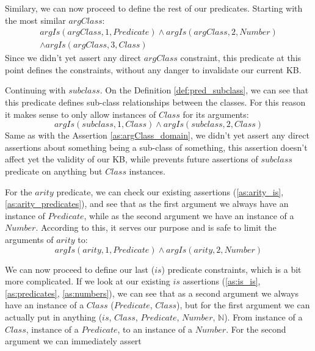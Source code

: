 Similary, we can now proceed to define the rest of our predicates. Starting with
the most similar $argClass$:
\begin{equation}\label{as:argClass_domain}
\begin{gathered}
	argIs(argClass,1,Predicate) \land argIs(argClass,2,Number) \\
	\land argIs(argClass,3,Class) 
\end{gathered}
\end{equation}
Since we didn't yet assert any direct $argClass$ constraint, this predicate
at this point defines the constraints, without any danger to invalidate our
current KB. 

Continuing with $subclass$. On the Definition \ref{def:pred_subclass}, 
we can see that this
predicate defines sub-class relationships between the classes. For this reason
it makes sense to only allow instances of $Class$ for its arguments:
\begin{equation}\label{as:subclass_is_constraint}
	argIs(subclass,1,Class) \land argIs(subclass,2,Class)
\end{equation}
Same as with the Assertion \ref{as:argClass_domain}, we didn't yet assert any 
direct assertions about something being a sub-class of something, this assertion
doesn't affect yet the validity of our KB, while prevents future assertions of 
$subclass$ predicate on anything but $Class$ instances.

For the $arity$ predicate, we can check our existing assertions 
(\ref{as:arity_is}, \ref{as:arity_predicates}), and
see that as the first argument we always have an instance of $Predicate$, while
as the second argument we have an instance of a $Number$. According to this, it
serves our purpose and is safe to limit the arguments of $arity$ to:
\begin{equation}\label{as:arity_is_constraint}
	argIs(arity,1,Predicate) \land argIs(arity,2,Number)
\end{equation}

We can now proceed to define our last ($is$) predicate constraints, which is
a bit more complicated. If we look at our existing  $is$ assertions 
(\ref{as:is_is}, \ref{as:predicates}, \ref{as:numbers}), we can
see that as a second argument we always have an instance of a $Class$ 
($Predicate$, $Class$), but
for the first argument we can actually put in anything ($is$, $Class$, 
$Predicate$,  $Number$, $\mathbb{N}$). From instance of a $Class$,
instance of a $Predicate$, to an instance of a $Number$. For the second argument
we can immediately assert

